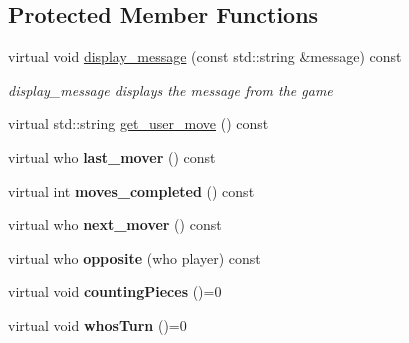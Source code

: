 \subsection*{Protected Member Functions}
\begin{DoxyCompactItemize}
\item 
virtual void \hyperlink{classmain__savitch__14_1_1game_ab8b87c3a1b68634861a8c0ed2b9f1992}{display\+\_\+message} (const std\+::string \&message) const 
\begin{DoxyCompactList}\small\item\em display\+\_\+message displays the message from the game \end{DoxyCompactList}\item 
virtual std\+::string \hyperlink{classmain__savitch__14_1_1game_a1265f262f5a15bca5b532e6e97d13089}{get\+\_\+user\+\_\+move} () const 
\item 
virtual who {\bfseries last\+\_\+mover} () const \hypertarget{classmain__savitch__14_1_1game_a38d435da6aadc192ac10160b26ea0cc1}{}\label{classmain__savitch__14_1_1game_a38d435da6aadc192ac10160b26ea0cc1}

\item 
virtual int {\bfseries moves\+\_\+completed} () const \hypertarget{classmain__savitch__14_1_1game_aee677d1ef52c35474cb7c6071bb71749}{}\label{classmain__savitch__14_1_1game_aee677d1ef52c35474cb7c6071bb71749}

\item 
virtual who {\bfseries next\+\_\+mover} () const \hypertarget{classmain__savitch__14_1_1game_a0d445fdec3201c91c145ee2763e08922}{}\label{classmain__savitch__14_1_1game_a0d445fdec3201c91c145ee2763e08922}

\item 
virtual who {\bfseries opposite} (who player) const \hypertarget{classmain__savitch__14_1_1game_ae38d001e92ebe46e1a1433e41446c7ab}{}\label{classmain__savitch__14_1_1game_ae38d001e92ebe46e1a1433e41446c7ab}

\item 
virtual void {\bfseries counting\+Pieces} ()=0\hypertarget{classmain__savitch__14_1_1game_a5954eccb6abf1ae900ad853ad2af99fa}{}\label{classmain__savitch__14_1_1game_a5954eccb6abf1ae900ad853ad2af99fa}

\item 
virtual void {\bfseries whos\+Turn} ()=0\hypertarget{classmain__savitch__14_1_1game_a98190a2bf784ce0f20533475754d136d}{}\label{classmain__savitch__14_1_1game_a98190a2bf784ce0f20533475754d136d}


\end{DoxyCompactItemize}
